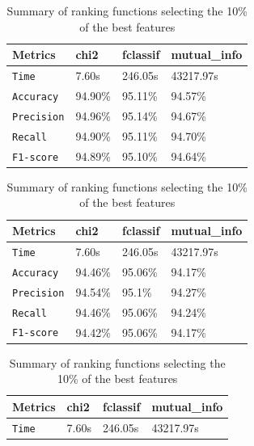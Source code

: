 \begin{table}[]

	\caption{Comparison of metrics score for different ranking functions with different percentages.}
	 \label{tab:rank}
	\begin{subtable}{\linewidth}
	\centering
	\caption{Summary of ranking functions selecting the 25\% of the best features}
	\label{tab:rank_function}
	\begin{tabular}{llll}
		\toprule
		\textbf{Metrics}  & \textbf{chi2} & \textbf{fclassif }& \textbf{mutual\_info} \\
		\midrule
		\texttt{Time} & 7.60s & 246.05s & 43217.97s\\
		
		\texttt{Accuracy} & 94.90\% &  95.11\% &  94.57\% \\
		\texttt{Precision}  & 94.96\% & 95.14\% &   94.67\%   \\ 
		\texttt{Recall} & 94.90\%  &   95.11\%  & 94.70\% \\ 
		\texttt{F1-score}  &   94.89\%   & 95.10\% &    94.64\%      \\ 
		\bottomrule
	\end{tabular}
	\end{subtable}

	\begin{subtable}{\linewidth}
	\centering
	\caption{Summary of ranking functions selecting the 15\% of the best features}
	\label{tab:rank_function15}
	\begin{tabular}{llll}
		\toprule
		\textbf{Metrics}  & \textbf{chi2} & \textbf{fclassif }& \textbf{mutual\_info} \\
		\midrule
		\texttt{Time} & 7.60s & 246.05s & 43217.97s\\
		
		\texttt{Accuracy} & 94.46\% &  95.06\% &  94.17\% \\
		\texttt{Precision}  & 94.54\% & 95.1\% &   94.27\%   \\ 
		\texttt{Recall} & 94.46\%  &   95.06\%  & 94.24\% \\ 
		\texttt{F1-score}  &   94.42\%   & 95.06\% &    94.17\%      \\ 
		\bottomrule
	\end{tabular}
	\end{subtable}
\begin{subtable}{\linewidth}
	\centering
	\caption{Summary of ranking functions selecting the 10\% of the best features}
	\label{tab:rank_function10}
	\begin{tabular}{llll}
		\toprule
		\textbf{Metrics}  & \textbf{chi2} & \textbf{fclassif }& \textbf{mutual\_info} \\
		\midrule
		\texttt{Time} & 7.60s & 246.05s & 43217.97s\\
		

\end{tabular}
\end{subtable}
\end{table}
